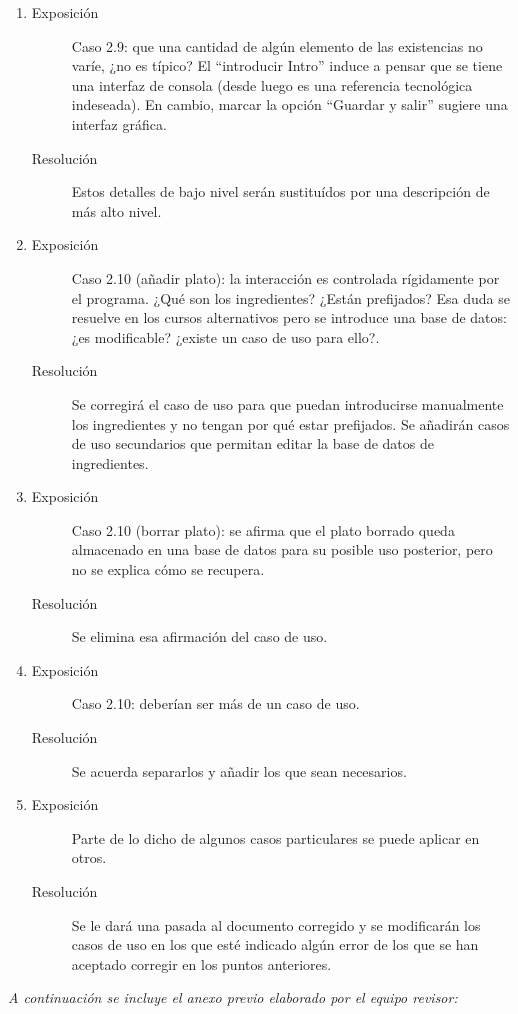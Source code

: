 \documentclass[11pt, a4paper, twoside]{article}
\newcommand{\problema}[2]{\begin{description} \item[Exposición] #1 \item[Resolución] #2 \end{description}}
\begin{document}
\begin{enumerate}
		\item \problema{Caso 2.9: que una cantidad de algún elemento de las existencias no varíe, ¿no es típico? El ``introducir Intro'' induce a pensar que se tiene una interfaz de consola (desde luego es una referencia tecnológica indeseada). En cambio, marcar la opción ``Guardar y salir'' sugiere una interfaz gráfica.}{Estos detalles de bajo nivel serán sustituídos por una descripción de más alto nivel.}
		\item \problema{Caso 2.10 (añadir plato): la interacción es controlada rígidamente por el programa. ¿Qué son los ingredientes? ¿Están prefijados? Esa duda se resuelve en los cursos alternativos pero se introduce una base de datos: ¿es modificable? ¿existe un caso de uso para ello?.}{Se corregirá el caso de uso para que puedan introducirse manualmente los ingredientes y no tengan por qué estar prefijados. Se añadirán casos de uso secundarios que permitan editar la base de datos de ingredientes.}
		\item \problema{Caso 2.10 (borrar plato): se afirma que el plato borrado queda almacenado en una base de datos para su posible uso posterior, pero no se explica cómo se recupera.}{Se elimina esa afirmación del caso de uso.}
		\item \problema{Caso 2.10: deberían ser más de un caso de uso.}{Se acuerda separarlos y añadir los que sean necesarios.}
		\item \problema{Parte de lo dicho de algunos casos particulares se puede aplicar en otros.}{Se le dará una pasada al documento corregido y se modificarán los casos de uso en los que esté indicado algún error de los que se han aceptado corregir en los puntos anteriores.}
	\end{enumerate}

	\vfill
	{\itshape A continuación se incluye el anexo previo elaborado por el equipo revisor: }

	
\end{document}
